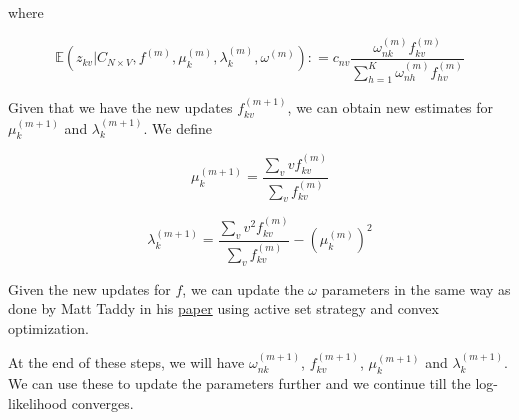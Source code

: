 \documentclass[]{article}
\begin{document}
where

\[ \mathbb{E} \left ( z_{kv} |  C_{N \times V}, f^{(m)}, \mu^{(m)}_{k}, \lambda^{(m)}_{k}, \omega^{(m)} \right) : = c_{nv} \frac{\omega^{(m)}_{nk} f^{(m)}_{kv}}{\sum_{h=1}^{K} \omega^{(m)}_{nh} f^{(m)}_{hv}} \]

Given that we have the new updates \(f^{(m+1)}_{kv}\), we can obtain new
estimates for \(\mu^{(m+1)}_{k}\) and \(\lambda^{(m+1)}_{k}\). We define

\[ \mu^{(m+1)}_{k} = \frac{\sum_{v} v f^{(m)}_{kv}}{\sum_{v} f^{(m)}_{kv}} \]

\[ \lambda^{(m+1)}_{k} = \frac{\sum_{v} v^2 f^{(m)}_{kv}}{\sum_{v} f^{(m)}_{kv}} - (\mu^{(m)}_{k})^2 \]

Given the new updates for \(f\), we can update the \(\omega\) parameters
in the same way as done by Matt Taddy in his
\href{http://arxiv.org/pdf/1109.4518v3.pdf}{paper} using active set
strategy and convex optimization.

At the end of these steps, we will have \(\omega^{(m+1)}_{nk}\),
\(f^{(m+1)}_{kv}\), \(\mu^{(m+1)}_{k}\) and \(\lambda^{(m+1)}_{k}\). We
can use these to update the parameters further and we continue till the
log-likelihood converges.
\end{document}
